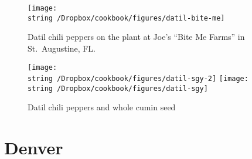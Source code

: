 \documentclass[12pt]{book}
\newcommand{\mychapter}[1]{
  \chapter{#1}
  }
\begin{document}
\begin{figure}
\begin{center}
\texttt{[image: \\string~/Dropbox/cookbook/figures/datil-bite-me]}
\end{center}
\caption*{Datil chili peppers on the plant at Joe's ``Bite Me Farms'' in St.\ Augustine, FL.}
\end{figure}
\begin{figure}
\begin{center}
\texttt{[image: \\string~/Dropbox/cookbook/figures/datil-sgy-2]}
\texttt{[image: \\string~/Dropbox/cookbook/figures/datil-sgy]}
\end{center}
\caption*{Datil chili peppers and whole cumin seed}
\end{figure}
\mychapter{Denver}


\clearpage
\printindex
\end{document}

